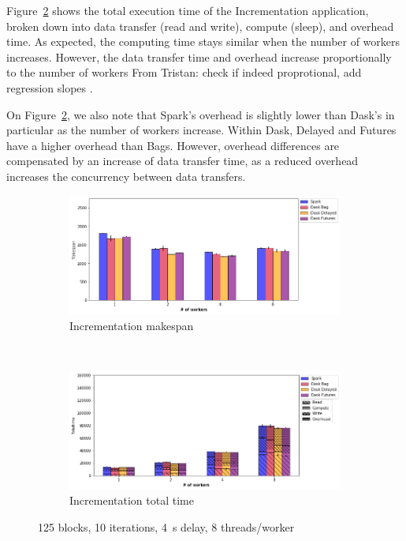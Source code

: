 \documentclass[conference]{IEEEtran}
\newcommand{\TG}[1]{\color{cyan}From Tristan: #1 \color{black}}
\begin{document}
Figure~\ref{fig:inc_tt_worker} shows the total execution time of the
Incrementation application, broken down into data transfer (read and
write), compute (sleep), and overhead time. As expected, the computing time
stays similar when the number of workers increases. However, the data
transfer time and overhead increase proportionally to the number of
workers \TG{check if indeed proprotional, add regression slopes}.

On Figure~\ref{fig:inc_tt_worker}, we also note that Spark's overhead is
slightly lower than Dask's in particular as the number of workers increase.
Within Dask, Delayed and Futures have a higher overhead than Bags. However,
overhead differences are compensated by an increase of data transfer time,
as a reduced overhead increases the concurrency between data transfers. 

\begin{figure}[!b]
    \centering
    \begin{subfigure}[b]{\columnwidth}
        \includegraphics[clip,width=\columnwidth]{images/inc_worker.png}%
        \caption{Incrementation makespan}\label{fig:inc_ms_worker}
    \end{subfigure}
    \\
    \begin{subfigure}[b]{\columnwidth}
        \includegraphics[clip,width=\columnwidth]{images/inc_idle_worker.png}%
        \caption{Incrementation total time}\label{fig:inc_tt_worker}
    \end{subfigure}
    \caption{125 blocks, 10 iterations, \SI{4}{\second} delay, 8
    threads/worker}\label{fig:inc_worker}
\end{figure}
\end{document}
